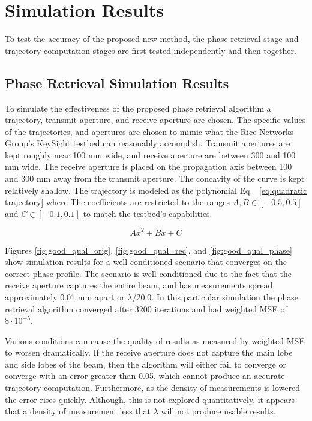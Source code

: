 \documentclass[11pt]{IEEEtran}
\begin{document}
\section{Simulation Results}

To test the accuracy of the proposed new method, the phase retrieval stage and trajectory computation stages are first tested independently and then together.

\subsection{Phase Retrieval Simulation Results}

To simulate the effectiveness of the proposed phase retrieval algorithm a trajectory, transmit aperture, and receive aperture are chosen.
The specific values of the trajectories, and apertures are chosen to mimic what the Rice Networks Group's KeySight testbed can reasonably accomplish.
Transmit apertures are kept roughly near 100 mm wide, and receive aperture are between 300 and 100 mm wide.
The receive aperture is placed on the propagation axis between 100 and 300 mm away from the transmit aperture.
The concavity of the curve is kept relatively shallow.
The trajectory is modeled as the polynomial Eq. ~\ref{eq:quadratic trajectory} where The coefficients are restricted to the ranges \(A, B \in [-0.5, 0.5]\) and \(C \in [-0.1, 0.1]\) to match the testbed's capabilities.

\begin{equation}
A x^2 + B x + C
\label{eq:quadratic trajectory}
\end{equation}

Figures \ref{fig:good_qual_orig}, \ref{fig:good_qual_rec}, and \ref{fig:good_qual_phase} show simulation results for a well conditioned scenario that converges on the correct phase profile.
The scenario is well conditioned due to the fact that the receive aperture captures the entire beam, and has measurements spread approximately 0.01 mm apart or \(\lambda\)/20.0.
In this particular simulation the phase retrieval algorithm converged after 3200 iterations and had weighted MSE of \(8 \cdot 10^{-5}\).

Various conditions can cause the quality of results as measured by weighted MSE to worsen dramatically.
If the receive aperture does not capture the main lobe and side lobes of the beam, then the algorithm will either fail to converge or converge with an error greater than 0.05, which cannot produce an accurate trajectory computation.
Furthermore, as the density of measurements is lowered the error rises quickly.
Although, this is not explored quantitatively, it appears that a density of measurement less that \(\lambda\) will not produce usable results.
\end{document}
